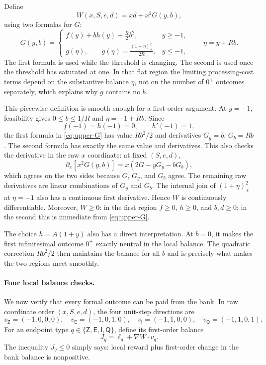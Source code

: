 Define
\begin{equation}
\label{eq:upper-W}
 W(x,S,e,d)=x d+x^2G(y,b),
\end{equation}
using two formulas for $G$:
\begin{equation}
\label{eq:upper-G}
 G(y,b)=
 \begin{cases}
  \displaystyle f(y)+b h(y)+\frac R2b^2,
       & y\ge-1,\\[2mm]
  \displaystyle g(\eta),\qquad
       g(\eta)=\frac{(1+\eta)_+^2}{2R},
       & y\le-1,
 \end{cases}
 \qquad \eta=y+Rb.
\end{equation}
The first formula is used while the threshold is changing.  The second is
used once the threshold has saturated at one.  In that flat region the
limiting processing-cost terms depend on the substantive balance $\eta$, not
on the number of $0^+$ outcomes separately, which explains why $g$ contains
no $b$.

This piecewise definition is smooth enough for a first-order argument.  At
$y=-1$, feasibility gives $0\le b\le1/R$ and $\eta=-1+Rb$.  Since
\[
 f(-1)=h(-1)=0,
 \qquad h'(-1)=1,
\]
the first formula in \eqref{eq:upper-G} has value $Rb^2/2$ and derivatives
$G_y=b$, $G_b=Rb$.  The second formula has exactly the same value and
derivatives.  This also checks the derivative in the raw $x$ coordinate:
at fixed $(S,e,d)$,
\[
 \partial_x\!\left[x^2G(y,b)\right]
 =x\left(2G-yG_y-bG_b\right),
\]
which agrees on the two sides because $G$, $G_y$, and $G_b$ agree.  The
remaining raw derivatives are linear combinations of $G_y$ and $G_b$.  The
internal join of $(1+\eta)_+^2$ at $\eta=-1$ also has a continuous first
derivative.  Hence $W$ is continuously differentiable.
Moreover, $W\ge0$: in the first region $f\ge0$, $h\ge0$, and $b,d\ge0$; in
the second this is immediate from \eqref{eq:upper-G}.

The choice $h=A(1+y)$ also has a direct interpretation.  At $b=0$, it makes
the first infinitesimal outcome $0^+$ exactly neutral in the local balance.
The quadratic correction $Rb^2/2$ then maintains the balance for all $b$ and
is precisely what makes the two regions meet smoothly.

\paragraph{Four local balance checks.}
We now verify that every formal outcome can be paid from the bank.  In raw
coordinate order $(x,S,e,d)$, the four unit-step directions are
\begin{equation}
\label{eq:upper-directions}
 v_{\mathsf Z}=(-1,0,0,0),\quad
 v_{\mathsf E}=(-1,0,1,0),\quad
 v_{\mathsf I}=(-1,1,0,0),\quad
 v_{\mathsf Q}=(-1,1,0,1).
\end{equation}
For an endpoint type $q\in\{\mathsf Z,\mathsf E,\mathsf I,\mathsf Q\}$,
define its first-order balance
\begin{equation}
\label{eq:upper-drift}
 J_q=\ell_q+\nabla W\cdot v_q.
\end{equation}
The inequality $J_q\le0$ simply says: local reward plus first-order change in
the bank balance is nonpositive.

